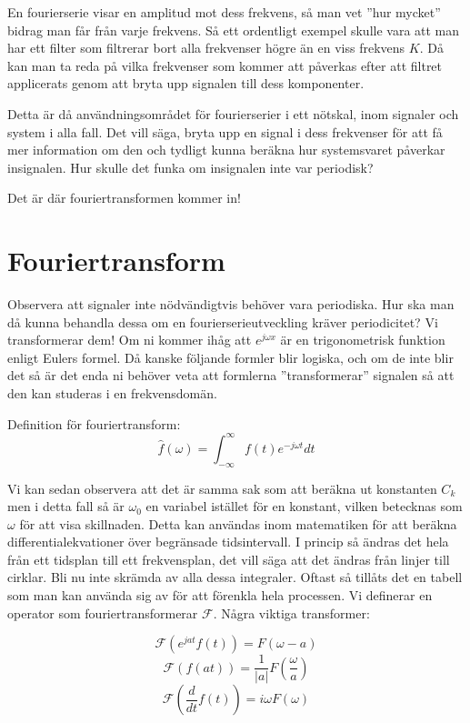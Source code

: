\documentclass{article}
\begin{document}
En fourierserie visar en amplitud mot dess frekvens, så man vet
''hur mycket'' bidrag man får från varje frekvens.
Så ett ordentligt exempel skulle vara att man har ett filter som
filtrerar bort alla frekvenser högre än en viss frekvens $K$.
Då kan man ta reda på vilka frekvenser som kommer att påverkas
efter att filtret applicerats genom att bryta upp signalen till dess komponenter.

Detta är då användningsområdet för fourierserier i ett nötskal,
inom signaler och system i alla fall.
Det vill säga, bryta upp en signal i dess frekvenser för att få mer
information om den och tydligt kunna beräkna hur systemsvaret påverkar insignalen.
Hur skulle det funka om insignalen inte var periodisk?

Det är där fouriertransformen kommer in!

\section{Fouriertransform}

Observera att signaler inte nödvändigtvis behöver vara periodiska.
Hur ska man då kunna behandla dessa om en fourierserieutveckling kräver
periodicitet? Vi transformerar dem! Om ni kommer ihåg att
$e^{j\omega x}$ är en trigonometrisk funktion enligt Eulers formel.
Då kanske följande formler blir logiska, och om de inte blir det så är det
enda ni behöver veta att formlerna ''transformerar'' signalen så att den kan
studeras i en frekvensdomän.

Definition för fouriertransform:
\begin{displaymath}
  \hat{f}(\omega) = \int_{-\infty}^{\infty} f(t) e^{-j \omega t} dt
\end{displaymath}

Vi kan sedan observera att det är samma sak som att beräkna ut konstanten $C_k$
men i detta fall så är $\omega_0$ en variabel istället för en konstant,
vilken betecknas som $\omega$ för att visa skillnaden.
Detta kan användas inom matematiken för att beräkna differentialekvationer
över begränsade tidsintervall. I princip så ändras det hela från ett tidsplan
till ett frekvensplan, det vill säga att det ändras från linjer till cirklar.
Bli nu inte skrämda av alla dessa integraler.
Oftast så tillåts det en tabell som man kan använda sig av för att förenkla
hela processen. Vi definerar en operator som fouriertransformerar $\mathcal{F}$.
Några viktiga transformer:

\begin{displaymath}
  \mathcal{F}(e^{j a t} f(t)) = F(\omega - a) %
\end{displaymath}
\begin{displaymath}
  \mathcal{F}(f(at)) = \frac{1}{|a|}F(\frac{\omega}{a}) %
\end{displaymath}
\begin{displaymath}
  \mathcal{F}(\frac{d}{dt} f(t)) = i\omega F(\omega) %
\end{displaymath}
\end{document}
